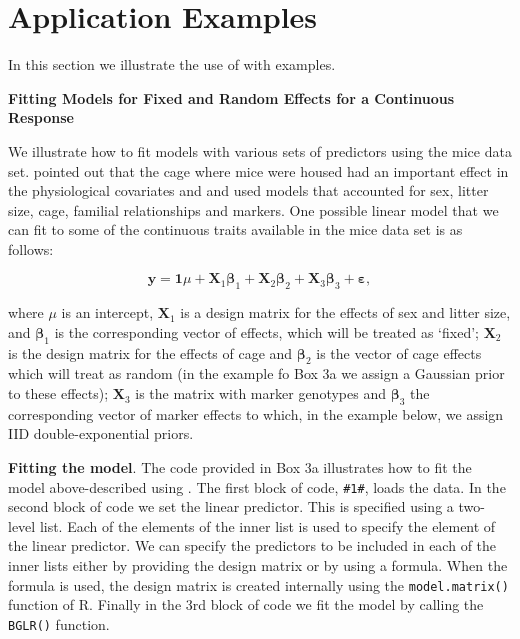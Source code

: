 \documentclass[article,shortnames,nojss]{jss}
\begin{document}
\section{Application Examples}
\label{sec:examples}

In this section we illustrate the use of  with examples.
 
\textbf{Fitting Models for Fixed and Random Effects for a Continuous Response}  
 
We illustrate how to fit models with various sets of predictors using the mice data set. 
\citet{Valdar:2006b} pointed out that the cage where mice were housed had an important effect in 
the physiological covariates and \citet{Legarra:2008} and \citet{delosCampos:2009a} used models 
that accounted for sex, litter size, cage, familial relationships and 
markers. One possible linear model that we can fit to some of the 
continuous traits available in the mice data set is as follows: 


\begin{equation*}
 \boldsymbol y= \boldsymbol 1 \mu + \boldsymbol X_1 \boldsymbol \beta_1 + %
                \boldsymbol X_2  \boldsymbol \beta_2 + %
                \boldsymbol X_3 \boldsymbol \beta_3 + %
                \boldsymbol \varepsilon, 
\end{equation*}

where $\mu$ is an intercept, $\boldsymbol X_1$ is a design matrix for the effects 
of sex and litter size, and $\boldsymbol \beta_1$ is the corresponding vector of effects, 
which will be treated as `fixed'; $\boldsymbol X_2$ is the design matrix for the 
effects of cage and $\boldsymbol \beta_2$ is the vector of cage effects 
which will treat as random (in the example fo Box 3a we assign a Gaussian prior 
to these effects); $\boldsymbol X_3$ is the matrix with marker 
genotypes and $\boldsymbol \beta_3$ the corresponding vector of 
marker effects to which, in the example below, we assign IID double-exponential priors.


\textbf{Fitting the model}. The code provided in Box 3a illustrates 
how to fit the model above-described using . The first block of code, \texttt{\#1\#}, 
loads the data. In the second block of code we set the linear predictor. 
This is specified using a two-level list. Each of the elements of the 
inner list is used to specify the element of the linear predictor. We can specify the predictors to 
be included in each of the inner lists either by providing the design matrix or by using a formula. When the 
formula is used, the design matrix is created internally using the 
\texttt{model.matrix()} function of R. Finally in the 
3rd block of code we fit the model by calling the \texttt{BGLR()} function.
\end{document}
